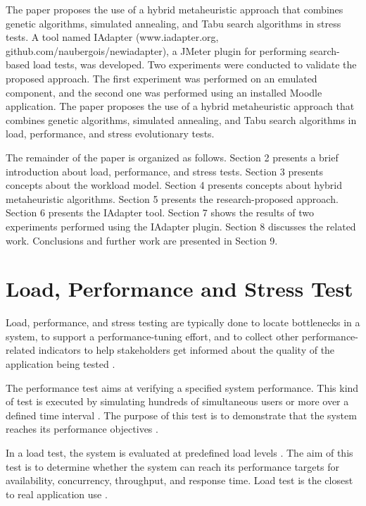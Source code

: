 \documentclass[conference]{IEEEtran}
\begin{document}
The paper proposes the use of a hybrid metaheuristic approach that combines genetic algorithms, simulated annealing, and Tabu search algorithms in stress tests. A tool named IAdapter (www.iadapter.org, github.com/naubergois/newiadapter), a JMeter plugin for performing search-based load tests, was developed. Two experiments were conducted to validate the proposed approach. The first experiment was performed on an emulated component, and the second one was performed using an installed Moodle application.
The paper proposes the use of a hybrid metaheuristic approach that combines genetic algorithms, simulated annealing, and Tabu search algorithms in load, performance, and stress evolutionary tests.


The remainder of the paper is organized as follows. Section 2 presents a brief introduction about load, performance, and stress tests. Section 3 presents concepts about the workload model. Section 4 presents concepts about hybrid metaheuristic algorithms. Section 5 presents the research-proposed approach. Section 6 presents the IAdapter tool. Section 7 shows the results of two experiments performed using the IAdapter plugin. Section 8 discusses the related work. Conclusions and further work are presented in Section 9.




\section{Load, Performance and Stress Test}

Load, performance, and stress testing are typically done to locate bottlenecks in a system, to support a performance-tuning effort, and to collect other performance-related indicators to help stakeholders get informed about the quality of the application being tested \cite{Sandler2004} \cite{Corporation2007}. 

The performance test aims at verifying a specified system performance. This kind of test is executed by simulating hundreds of simultaneous users or more over a defined time interval \cite{DiLucca2006}. The purpose of this test is to demonstrate that the system reaches its performance objectives \cite{Sandler2004}. 


In a load test, the system is evaluated at predefined load levels \cite{DiLucca2006}. The aim of this test is to determine whether the system can reach its performance targets for availability, concurrency, throughput, and response time. Load test is the closest to real application use \cite{Molyneaux2009}.
\end{document}
